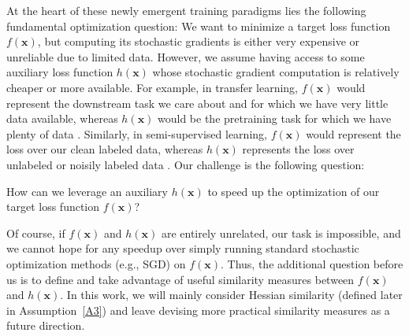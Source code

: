 \documentclass[10pt]{article} %
\theoremstyle{plain}
\theoremstyle{definition}
\theoremstyle{remark}
\def\vx{{\bm{x}}}
\begin{document}
At the heart of these newly emergent training paradigms lies the following fundamental optimization question: We want to minimize a target loss function $f(\vx)$, but computing its stochastic gradients is either very expensive or unreliable due to limited data. However, we assume having access to some auxiliary loss function $h(\vx)$ whose stochastic gradient computation is relatively cheaper or more available. For example, in transfer learning, $f(\vx)$ would represent the downstream task we care about and for which we have very little data available, whereas $h(\vx)$ would be the pretraining task for which we have plenty of data \citep{yosinski2014transferable}. Similarly, in semi-supervised learning, $f(\vx)$ would represent the loss over our clean labeled data, whereas $h(\vx)$ represents the loss over unlabeled or noisily labeled data \citep{chapelle2009semi}. Our challenge is the following question:
    \begin{center}
        How can we leverage an auxiliary $h(\vx)$ to speed up the optimization of our target loss function $f(\vx)$?
    \end{center}

Of course, if $f(\vx)$ and $h(\vx)$ are entirely unrelated, our task is impossible, and we cannot hope for any speedup over simply running standard stochastic optimization methods (e.g., SGD) on $f(\vx)$. Thus, the additional question before us is to define and take advantage of useful similarity measures between $f(\vx)$ and $h(\vx)$. In this work, we will mainly consider Hessian similarity (defined later in Assumption~\ref{A3}) and leave devising more practical similarity measures as a future direction.
\end{document}
